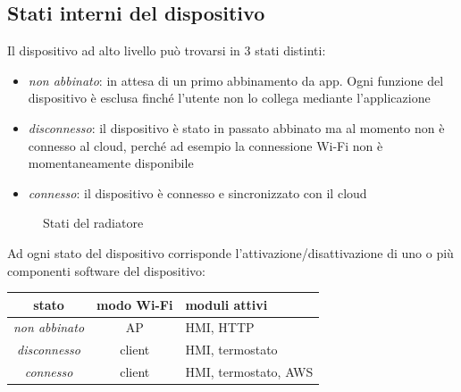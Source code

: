\documentclass[12pt,a4paper,twoside,titlepage]{book}
\begin{document}
\subsection{Stati interni del dispositivo}

Il dispositivo ad alto livello può trovarsi in 3 stati distinti:

\begin{itemize}
    \item \textit{non abbinato}: in attesa di un primo abbinamento da app. Ogni funzione del
        dispositivo è esclusa finché l'utente non lo collega mediante l'applicazione
    \item \textit{disconnesso}: il dispositivo è stato in passato abbinato ma al momento non è
        connesso al cloud, perché ad esempio la connessione Wi-Fi non è momentaneamente disponibile
    \item \textit{connesso}: il dispositivo è connesso e sincronizzato con il cloud
\end{itemize}

\begin{figure}[ht]
    \centering
    \caption{Stati del radiatore}
    \label{fig:stati}
\end{figure}

Ad ogni stato del dispositivo corrisponde l'attivazione/disattivazione di uno o più
componenti software del dispositivo:

\begin{center}
\begin{tabular}{| c | c | l |}
    \hline
    stato & modo Wi-Fi & moduli attivi \\
    \hline
    \textit{non abbinato} & AP & HMI, HTTP \\
    \hline
    \textit{disconnesso} & client & HMI, termostato \\
    \hline
    \textit{connesso} & client & HMI, termostato, AWS \\
    \hline
\end{tabular}
\end{center}
\end{document}

